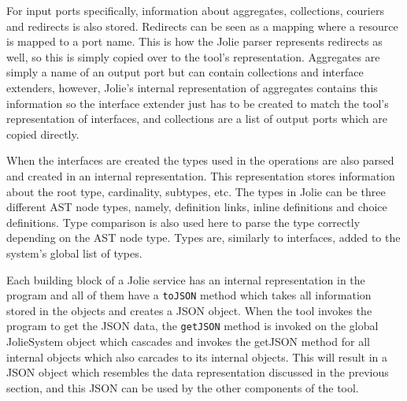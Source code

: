 For input ports specifically, information about aggregates, collections, couriers and redirects is also stored. Redirects can be seen as a mapping where a resource is mapped to a port name. This is how the Jolie parser represents redirects as well, so this is simply copied over to the tool's representation.
Aggregates are simply a name of an output port but can contain collections and interface extenders, however, Jolie's internal representation of aggregates contains this information so the interface extender just has to be created to match the tool's representation of interfaces, and collections are a list of output ports which are copied directly.

When the interfaces are created the types used in the operations are also parsed and created in an internal representation.
This representation stores information about the root type, cardinality, subtypes, etc.
The types in Jolie can be three different AST node types, namely, definition links, inline definitions and choice definitions. Type comparison is also used here to parse the type correctly depending on the AST node type.
Types are, similarly to interfaces, added to the system's global list of types.

Each building block of a Jolie service has an internal representation in the \javatoolname[] program and all of them have a \texttt{toJSON} method which takes all information stored in the objects and creates a JSON object.
When the tool invokes the \javatoolname[] program to get the JSON data, the \texttt{getJSON} method is invoked on the global JolieSystem object which cascades and invokes the getJSON method for all internal objects which also carcades to its internal objects.
This will result in a JSON object which resembles the data representation discussed in the previous section, and this JSON can be used by the other components of the tool.

